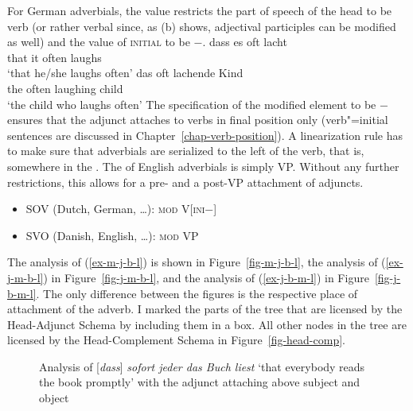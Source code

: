 \noindent
For German adverbials, the value restricts the part of speech of the head to be verb (or rather
verbal since, as (b) shows, adjectival participles can be modified as
well) and the value of \textsc{initial} to be $-$. 
\eal
\ex
\gll dass es oft lacht\\
     that it often laughs\\\german
\glt `that he/she laughs often'
\ex 
\gll das oft lachende Kind\\
     the often laughing child\\
\glt `the child who laughs often'
\zl
The specification of the modified element to be \initial{}$-$ ensures that the adjunct attaches to
verbs in final position only (verb"=initial sentences are discussed in
Chapter~\ref{chap-verb-position}). A linearization rule has to make sure that adverbials are
serialized to the left of the verb, that is, somewhere in the \mf. The \modv of English adverbials
is simply VP. Without any further restrictions, this allows for a pre- and a post-VP attachment of
adjuncts.
\begin{itemize}
\item SOV (Dutch, German, \ldots): \textsc{mod} V[\textsc{ini}$-$]
\item SVO (Danish, English, \ldots): \textsc{mod} VP
\end{itemize}

\noindent
The analysis of (\ref{ex-m-j-b-l}) is shown in Figure~\vref{fig-m-j-b-l}, the analysis of
(\ref{ex-j-m-b-l}) in Figure~\vref{fig-j-m-b-l}, and the analysis of (\ref{ex-j-b-m-l}) in
Figure~\vref{fig-j-b-m-l}. The only difference between the figures is the respective place of
attachment of the adverb. I marked the parts of the tree that are licensed by the Head-Adjunct
Schema by including them in a box. All other nodes in the tree are licensed by the Head-Complement
Schema in Figure~\ref{fig-head-comp}.


\begin{figure}

\caption{\label{fig-m-j-b-l}Analysis of [\emph{dass}] \emph{sofort jeder das Buch liest} `that everybody reads the
  book promptly' with the adjunct attaching above subject and object}
\end{figure}


